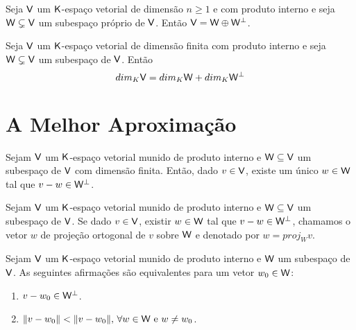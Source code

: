 \documentclass[10pt,a4paper]{book}
\begin{document}
\begin{proposition}
	Seja $\mathsf{ V }$ um $\mathsf{ K }$-espaço vetorial de dimensão $n \geq 1$ e com produto interno e seja $\mathsf{ W } \subsetneq \mathsf{ V }$ um subespaço próprio de $\mathsf{ V }$. Então $\mathsf{ V } = \mathsf{ W } \oplus \mathsf{ W } ^ \perp$.
\end{proposition}

\begin{corollary}
	Seja $\mathsf{ V }$ um $\mathsf{ K }$-espaço vetorial de dimensão finita com produto interno e seja $\mathsf{ W } \subsetneq \mathsf{ V }$ um subespaço de $\mathsf{ V }$. Então 
	\[
		dim_K \mathsf{ V } = dim_K \mathsf{ W } + dim_K \mathsf{ W } ^ \perp
	\]
\end{corollary}




\section{A Melhor Aproximação}

\begin{proposition}
	Sejam $\mathsf{ V }$ um $\mathsf{ K }$-espaço vetorial munido de produto interno e $\mathsf{ W } \subseteq \mathsf{ V }$ um subespaço de $\mathsf{ V }$ com dimensão finita. Então, dado $v \in \mathsf{ V }$, existe um único $w \in \mathsf{ W }$ tal que $v - w \in \mathsf{ W } ^ \perp$.
\end{proposition}

\begin{definition}
	Sejam $\mathsf{ V }$ um $\mathsf{ K }$-espaço vetorial munido de produto interno e $\mathsf{ W } \subseteq \mathsf{ V }$ um subespaço de $\mathsf{ V }$. Se dado $v \in \mathsf{ V }$, existir $w \in \mathsf{ W }$ tal que $v - w \in \mathsf{ W } ^ \perp$, chamamos o vetor $w$ de projeção ortogonal de $v$ sobre $\mathsf{ W }$ e denotado por $w = proj_W v$.
\end{definition}

\begin{proposition}
	Sejam $\mathsf{ V }$ um $\mathsf{ K }$-espaço vetorial munido de produto interno e $\mathsf{ W }$ um subespaço de $\mathsf{ V }$. As seguintes afirmações são equivalentes para um vetor $w_0 \in \mathsf{ W }$:
	\begin{enumerate}
		\item $v - w_0 \in \mathsf{ W } ^ \perp$.
		\item $\lVert v - w_0 \rVert < \lVert v - w_0 \rVert, \, \forall w \in \mathsf{ W } \text{ e } w \neq w_0$.
	\end{enumerate}
\end{proposition}
\end{document}

